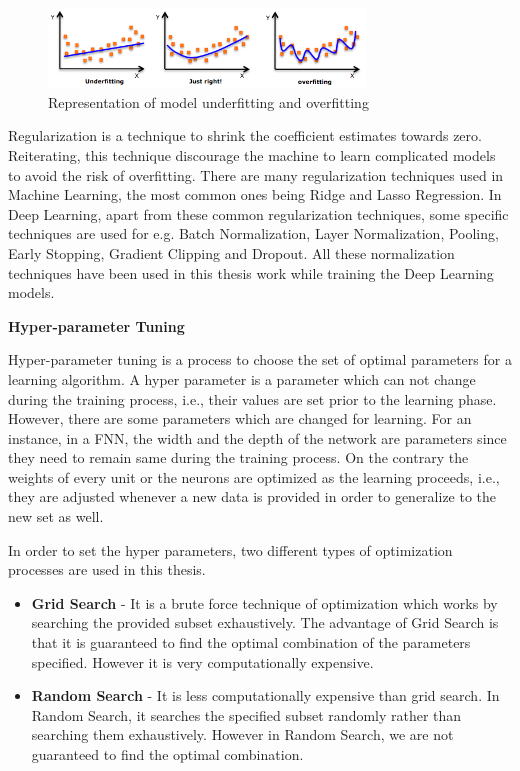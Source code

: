 \begin{figure}[ht]
  \begin{center}
    \includegraphics[width=0.750\textwidth]{Master's thesis/images/regular.png} 
    \caption{Representation of model underfitting and overfitting ~\cite{Goodfellow-et-al-2016}}
    \label{fig:FNN}
  \end{center}
\end{figure} 

Regularization is a technique to shrink the coefficient estimates towards zero. Reiterating, this technique discourage the machine to learn complicated models to avoid the risk of overfitting. There are many regularization techniques used in Machine Learning, the most common ones being Ridge and Lasso Regression. In Deep Learning, apart from these common regularization techniques, some specific techniques are used for e.g. Batch Normalization, Layer Normalization, Pooling, Early Stopping, Gradient Clipping and Dropout. All these normalization techniques have been used in this thesis work while training the Deep Learning models.
\newline

\noindent \textbf{Hyper-parameter Tuning}
\newline

\noindent Hyper-parameter tuning is a process to choose the set of optimal parameters for a learning algorithm. A hyper parameter is a parameter which can not change during the training process, i.e., their values are set prior to the learning phase. However, there are some parameters which are changed for learning. For an instance, in a FNN, the width and the depth of the network are parameters since they need to remain same during the training process. On the contrary the weights of every unit or the neurons are optimized as the learning proceeds, i.e., they are adjusted whenever a new data is provided in order to generalize to the new set as well.

In order to set the hyper parameters, two different types of optimization processes are used in this thesis.
\begin{itemize}
    \item \textbf{Grid Search} - It is a brute force technique of optimization which works by searching the provided subset exhaustively. The advantage of Grid Search is that it is guaranteed to find the optimal combination of the parameters specified. However it is very computationally expensive.
    \item \textbf{Random Search} - It is less computationally expensive than grid search. In Random Search, it searches the specified subset randomly rather than searching them exhaustively. However in Random Search, we are not guaranteed to find the optimal combination.
\end{itemize}




